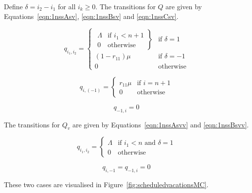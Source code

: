 \documentclass{article}
\begin{document}
Define $\delta = i_2 - i_1$ for all $i_k \geq 0$.
The transitions for $Q$ are given by Equations~\ref{eqn:1nssAsv}, \ref{eqn:1nssBsv} and \ref{eqn:1nssCsv}.

\begin{equation}\label{eqn:1nssAsv}
  q_{i_1, i_2} = \left\{
  \begin{array}{rr}
    \left. \begin{array}{rr}
      \Lambda & \text{if } i_1 < n + 1 \\
      0 & \text{otherwise}
    \end{array} \right\} & \text{if } \delta = 1 \\
    (1 - r_{11})\mu & \text{if } \delta = -1 \\
    0 & \text{otherwise}
  \end{array} \right.
\end{equation}

\begin{equation}\label{eqn:1nssBsv}
  q_{i, (-1)} = \left\{
  \begin{array}{rr}
    r_{11}\mu & \text{if } i = n + 1 \\
    0 & \text{otherwise}
  \end{array}
  \right.
\end{equation}

\begin{equation}\label{eqn:1nssCsv}
  q_{-1, i} = 0
\end{equation}

The transitions for $Q_v$ are given by Equations~\ref{eqn:1nssAsvv} and \ref{eqn:1nssBsvv}.

\begin{equation}\label{eqn:1nssAsvv}
  q_{i_1, i_2} = \left\{
  \begin{array}{rr}
      \Lambda & \text{if } i_1 < n \text{ and } \delta = 1 \\
      0 & \text{otherwise}
  \end{array} \right.
\end{equation}

\begin{equation}\label{eqn:1nssBsvv}
  q_{i, -1} = q_{-1, i} = 0
\end{equation}

These two cases are visualised in Figure~\ref{fig:scheduledvacationsMC}.
\end{document}
